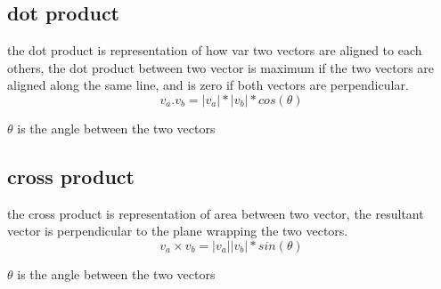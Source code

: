 \documentclass[4apaper,12pt]{book}
\begin{document}
\begin{description}
    \subsection{dot product}
    \begin{description}
    \item the dot product is representation of how var two vectors are aligned to each others, the dot product between two vector is maximum if the two vectors are aligned along the same line, and is zero if both vectors are perpendicular.
      \begin{equation} v_a . v_b = \left|v_a\right|*\left|v_b\right|*cos(\theta) \end{equation}
        \item  $\theta$ is the angle between the two vectors
    \end{description}
    \subsection{cross product}
    \begin{description}
    \item the cross product is representation of area between two vector, the resultant vector is perpendicular to the plane wrapping the two vectors.
      \begin{equation} v_a \times v_b = \left|v_a\right|\left|v_b\right|*sin(\theta) \end{equation}
        \item $\theta$ is the angle between the two vectors
      \end{description}
  \end{description}
\end{document}
